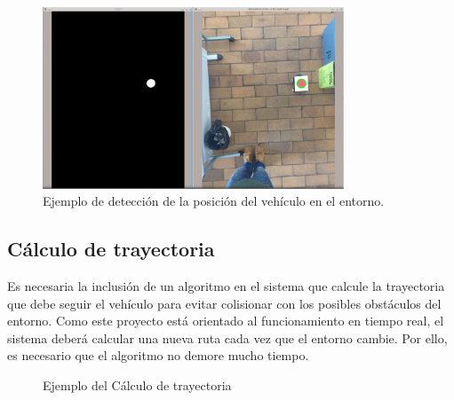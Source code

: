 \begin{figure}[htbp]
 \centering
    \includegraphics[width=0.8\textwidth]{./figures/deteccionvehiculo.jpeg}
 \caption{Ejemplo de detección de la posición del vehículo en el entorno.}
 \label{fig:EstadosLaboratorio}
\end{figure}

\subsection{Cálculo de trayectoria}\label{sec:CalculoTrayectoria}

Es necesaria la inclusión de un algoritmo en el sistema que calcule la trayectoria que debe seguir el vehículo para evitar colisionar con los posibles obstáculos del entorno. Como este proyecto está orientado al funcionamiento en tiempo real, el sistema deberá calcular una nueva ruta cada vez que el entorno cambie. Por ello, es necesario que el algoritmo no demore mucho tiempo.

\begin{figure}[htbp]
 \centering
 \caption{Ejemplo del Cálculo de trayectoria}
 \label{fig:CalculoTrayectoria}
\end{figure}

